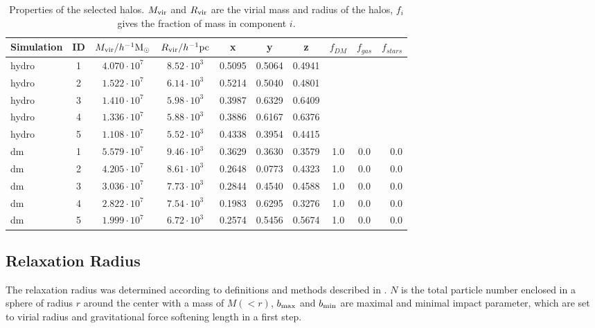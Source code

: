 \documentclass[useAMS,usenatbib]{mn2e}
\begin{document}
\begin{table}
  \begin{center} \begin{tabular}{lccccccccr} \hline Simulation &
      ID & $M_{\rm vir} / h^{-1}{\rm M}_\odot $ & $R_{\rm vir} /
      h^{-1}{\rm pc}$ &x&y&z& $f_{DM}$ & $f_{gas}$ & $f_{stars}$ \\ 
      \hline
      hydro & 1 & $4.070\cdot10^7$ & $8.52\cdot10^3$&0.5095&0.5064&0.4941&&& \\
      hydro & 2 & $1.522\cdot10^7$ & $6.14\cdot10^3$&0.5214&0.5040&0.4801&&& \\
      hydro & 3 & $1.410\cdot10^7$ & $5.98\cdot10^3$&0.3987&0.6329&0.6409&&& \\
      hydro & 4 & $1.336\cdot10^7$ & $5.88\cdot10^3$&0.3886&0.6167&0.6376&&& \\
      hydro & 5 & $1.108\cdot10^7$ & $5.52\cdot10^3$&0.4338&0.3954&0.4415&&& \\
      \hline
      dm&1&$5.579\cdot10^7$&$9.46\cdot10^3$&0.3629&0.3630&0.3579&1.0&0.0&0.0\\
      dm&2&$4.205\cdot10^7$&$8.61\cdot10^3$&0.2648&0.0773&0.4323&1.0&0.0&0.0\\
      dm&3&$3.036\cdot10^7$&$7.73\cdot10^3$&0.2844&0.4540&0.4588&1.0&0.0&0.0\\
      dm&4&$2.822\cdot10^7$&$7.54\cdot10^3$&0.1983&0.6295&0.3276&1.0&0.0&0.0\\
      dm&5&$1.999\cdot10^7$&$6.72\cdot10^3$&0.2574&0.5456&0.5674&1.0&0.0&0.0\\
      \hline
    \end{tabular} \end{center}
  \caption{\label{tab:haloprop}Properties of the selected halos. $M_{\rm vir}$ and $R_{\rm vir}$ are the virial mass and radius of the halos, $f_i$ gives the fraction of mass in component $i$.}
\end{table}

\subsection{Relaxation Radius}
The relaxation radius was determined according to definitions and
methods described in \cite{Read2009}. $N$ is the total particle number
enclosed in a sphere of radius $r$ around the center with a mass of
$M(<r)$, $b_{\rm max}$ and $b_{\rm min}$ are maximal and minimal
impact parameter, which are set to virial radius and gravitational
force softening length in a first step.
\end{document}
